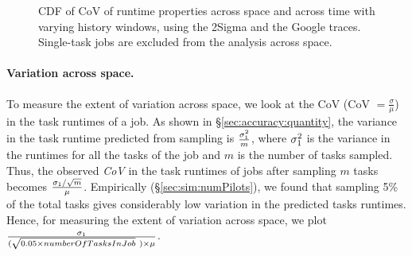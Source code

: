 \begin{figure}[tp]
{\label{fig:accuracy:trace_analysis_window:google11:diskIO}
}
\vspace{-0.1in}
\caption{CDF of CoV of runtime properties 
  across space
  and across time with varying history windows,
          using the 2Sigma and the Google traces.
	  Single-task jobs are excluded from the analysis across space.
        }
\vspace{-0.1in}
\label{fig:accuracy:trace_analysis_window}
\end{figure}

\paragraph{Variation across space.} 
To measure the extent of variation across space, we look at the
CoV (CoV $= \frac{\sigma}{\mu}$) in the task
runtimes of a job.  As shown in \S\ref{sec:accuracy:quantity}, the variance in
the task runtime predicted from sampling is $\frac{\sigma_1^2}{m}$, where
$\sigma_1^2$ is the variance in the runtimes for all the tasks of the job
and $m$ is the number of tasks sampled.  Thus, the observed \textit{CoV} in the
task runtimes of jobs after sampling $m$ tasks becomes
$\frac{\sigma_1/\sqrt{m}}{\mu}$.
Empirically (\S\ref{sec:sim:numPilots}), we found that sampling 5\% of the
total tasks gives considerably low variation in the predicted tasks runtimes.
Hence, for measuring the extent of variation across space, we plot
$\frac{\sigma_1}{(\sqrt{0.05\times numberOfTasksInJob}\ )\times\mu}$.

